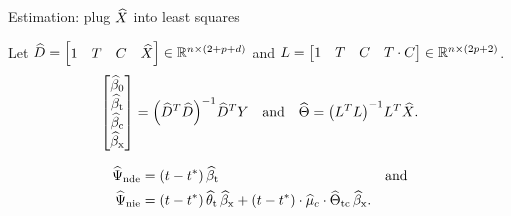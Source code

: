 \documentclass[aspectratio=169]{beamer}
\theoremstyle{remark}
\begin{document}
\begin{frame}{Estimation: plug $\widehat{X}$ into least squares}

    Let $\widehat{D} = \begin{bmatrix} 1 & T & C  & \widehat{X} \end{bmatrix} \in \mathbb{R}^{n \times (2 + p + d)}$ and $L = \begin{bmatrix} 1 & T & C  & T \cdot C \end{bmatrix} \in \mathbb{R}^{n \times (2 p + 2)}$.
    \begin{equation*}
        \begin{bmatrix}
            \betazerohat \\
            \betathat    \\
            \betachat    \\
            \betaxhat
        \end{bmatrix}
        = \paren*{\Dhat^T \Dhat}^{-1} \Dhat^T Y
        \quad \text{and} \quad
        \Thetahat
        = \paren*{\Wfull^T \Wfull}^{-1} \Wfull^T \Xhat.
    \end{equation*}

    \begin{align*}
        \ndehat & = \paren*{t - t^*} \, \betathat                                                                                        & \text{and} \\
        \niehat & = \paren*{t - t^*} \, \thetathat \, \betaxhat + \paren*{t - t^*} \cdot \widehat{\mu}_c \cdot \Thetatchat \, \betaxhat.
    \end{align*}
\end{frame}
\end{document}
